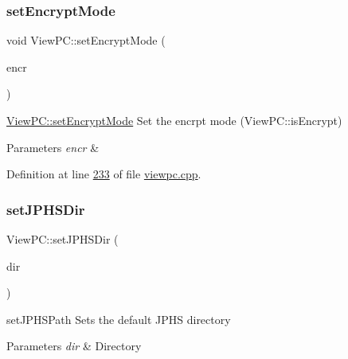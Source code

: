 \subsubsection{\texorpdfstring{set\+Encrypt\+Mode}{setEncryptMode}}
{\footnotesize\ttfamily void View\+P\+C\+::set\+Encrypt\+Mode (\begin{DoxyParamCaption}\item[{bool}]{encr }\end{DoxyParamCaption})\hspace{0.3cm}{\ttfamily [slot]}}



\mbox{\hyperlink{class_view_p_c_a5b48951efefdc0e3039c9a4bf185320b}{View\+P\+C\+::set\+Encrypt\+Mode}} Set the encrpt mode (View\+P\+C\+::is\+Encrypt) 


\begin{DoxyParams}{Parameters}
{\em encr} & \\
\hline
\end{DoxyParams}


Definition at line \mbox{\hyperlink{viewpc_8cpp_source_l00233}{233}} of file \mbox{\hyperlink{viewpc_8cpp_source}{viewpc.\+cpp}}.

\mbox{\label{class_view_p_c_ababceedc355ecc1217a4c708e19e5e6b}} 
\subsubsection{\texorpdfstring{set\+J\+P\+H\+S\+Dir}{setJPHSDir}}
{\footnotesize\ttfamily View\+P\+C\+::set\+J\+P\+H\+S\+Dir (\begin{DoxyParamCaption}\item[{Q\+String}]{dir }\end{DoxyParamCaption})\hspace{0.3cm}{\ttfamily [signal]}}



set\+J\+P\+H\+S\+Path Sets the default J\+P\+HS directory 


\begin{DoxyParams}{Parameters}
{\em dir} & Directory \\
\hline
\end{DoxyParams}
\mbox{\label{class_view_p_c_a9c32a1fdb6ead84e5ada8fba8860c7ed}} 
